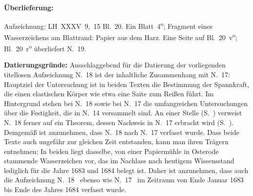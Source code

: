 %
%
%
%
%
\frenchspacing%
%
\begin{ledgroupsized}[r]{120mm}
\footnotesize
\pstart
\noindent\textbf{Überlieferung:}
\pend
\end{ledgroupsized}
\begin{ledgroupsized}[r]{114mm}
\footnotesize
\pstart \parindent -6mm
%
Aufzeichnung: LH~XXXV~9,~15 Bl.~20.
Ein Blatt~4\textsuperscript{o};
Fragment eines Wasserzeichens am Blattrand:
Papier aus dem Harz.
Eine Seite auf Bl.~20~v\textsuperscript{o};
Bl.~20~r\textsuperscript{o} überliefert N.~19.
\pend
\end{ledgroupsized}
%
%
\vspace*{5mm}
\begin{ledgroup}
\footnotesize
\pstart
\noindent%
\textbf{Datierungsgründe:}\label{LH_35_09_15_020v_Datierung}
Ausschlaggebend für die Datierung der vorliegenden titellosen Aufzeichnung N.~18 ist der inhaltliche Zusammenhang mit N.~17:
Hauptziel der Untersuchung ist in beiden Texten die Bestimmung der Spannkraft, die einen elastischen Körper wie etwa eine Saite %
zum Reißen führt.
Im Hintergrund stehen bei N.~18 sowie bei N.~17 die umfangreichen Untersuchungen über die Festigkeit, die in N.~14 versammelt sind.
An einer Stelle (S.~) verweist N.~18 ferner auf ein Theorem, dessen Nachweis in N.~17 erbracht wird (S.~).
Demgemäß ist anzunehmen, dass N.~18 nach N.~17 verfasst wurde.
Dass beide Texte auch ungefähr zur gleichen Zeit entstanden, kann man ihren Trägern entnehmen: In beiden liegt dasselbe, von einer Papiermühle in Osterode stammende Wasserzeichen vor, das im Nachlass nach heutigem Wissensstand lediglich für die Jahre 1683 und 1684 belegt ist.\protect{}\protect{}
Daher ist anzunehmen, dass auch die Aufzeichnung N.~18 \textendash\ ebenso wie N.~17 \textendash\ im Zeitraum von Ende Januar 1683 bis Ende des Jahres 1684 verfasst wurde.
\pend
\end{ledgroup}
